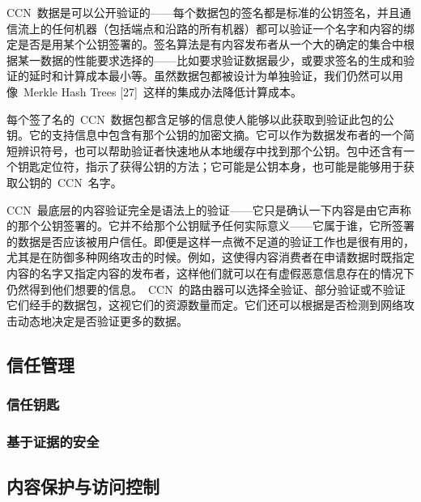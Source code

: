 CCN~数据是可以公开验证的——每个数据包的签名都是标准的公钥签名，并且通信流上的任何机器（包括端点和沿路的所有机器）都可以验证一个名字和内容的绑定是否是用某个公钥签署的。签名算法是有内容发布者从一个大的确定的集合中根据某一数据的性能要求选择的——比如要求验证数据最少，或要求签名的生成和验证的延时和计算成本最小等。虽然数据包都被设计为单独验证，我们仍然可以用像~Merkle Hash Trees [27]~这样的集成办法降低计算成本。

每个签了名的~CCN~数据包都含足够的信息使人能够以此获取到验证此包的公钥。它的支持信息中包含有那个公钥的加密文摘。它可以作为数据发布者的一个简短辨识符号，也可以帮助验证者快速地从本地缓存中找到那个公钥。包中还含有一个钥匙定位符，指示了获得公钥的方法；它可能是公钥本身，也可能是能够用于获取公钥的~CCN~名字。

CCN~最底层的内容验证完全是语法上的验证——它只是确认一下内容是由它声称的那个公钥签署的。它并不给那个公钥赋予任何实际意义——它属于谁，它所签署的数据是否应该被用户信任。即便是这样一点微不足道的验证工作也是很有用的，尤其是在防御多种网络攻击的时候。例如，这使得内容消费者在申请数据时既指定内容的名字又指定内容的发布者，这样他们就可以在有虚假恶意信息存在的情况下仍然得到他们想要的信息。~CCN~的路由器可以选择全验证、部分验证或不验证它们经手的数据包，这视它们的资源数量而定。它们还可以根据是否检测到网络攻击动态地决定是否验证更多的数据。

\subsection{信任管理}
\label{sec:5.2}

\subsubsection{信任钥匙}
\label{sec:5.2.1}

\subsubsection{基于证据的安全}
\label{sec:5.2.2}

\subsection{内容保护与访问控制}
\label{sec:5.3}

